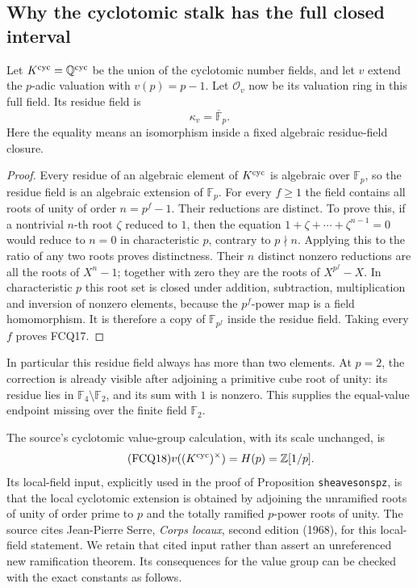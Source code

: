 \subsection{Why the cyclotomic stalk has the full closed interval}

Let $K^{\rm cyc}=\mathbb Q^{\rm cyc}$ be the union of the
cyclotomic number fields, and let $v$ extend the $p$-adic
valuation with $v(p)=p-1$. Let $\mathcal O_v$ now be its
valuation ring in this full field. Its residue field is
\begin{equation}\tag{FCQ17}
\kappa_v=\overline{\mathbb F}_p.
\end{equation}
Here the equality means an isomorphism inside a fixed
algebraic residue-field closure.

\begin{proof}
Every residue of an algebraic element of $K^{\rm cyc}$
is algebraic over $\mathbb F_p$, so the residue field is
an algebraic extension of $\mathbb F_p$. For every $f\ge1$
the field contains all roots of unity of order
$n=p^f-1$. Their reductions are distinct. To prove this,
if a nontrivial $n$-th root $\zeta$ reduced to $1$,
then the equation
$1+\zeta+\cdots+\zeta^{n-1}=0$ would reduce to
$n=0$ in characteristic $p$, contrary to $p\nmid n$.
Applying this to the ratio of any two roots proves
distinctness. Their $n$ distinct nonzero reductions are
all the roots of $X^n-1$; together with zero they are
the roots of $X^{p^f}-X$. In characteristic $p$ this
root set is closed under addition, subtraction,
multiplication and inversion of nonzero elements,
because the $p^f$-power map is a field homomorphism.
It is therefore a copy of $\mathbb F_{p^f}$ inside
the residue field. Taking every $f$ proves FCQ17.
\end{proof}

In particular this residue field always has more than two
elements. At $p=2$, the correction is already visible after
adjoining a primitive cube root of unity: its residue lies
in $\mathbb F_4\setminus\mathbb F_2$, and its sum with $1$
is nonzero. This supplies the equal-value endpoint missing
over the finite field $\mathbb F_2$.

The source's cyclotomic value-group calculation, with its
scale unchanged, is
\begin{equation}\tag{FCQ18}
v((K^{\rm cyc})^\times)=H(p)=\mathbb Z[1/p].
\end{equation}
Its local-field input, explicitly used in the proof of
Proposition \texttt{sheavesonspz}, is that the local
cyclotomic extension is obtained by adjoining the unramified
roots of unity of order prime to $p$ and the totally ramified
$p$-power roots of unity. The source cites Jean-Pierre Serre,
\emph{Corps locaux}, second edition (1968), for this
local-field statement. We retain that cited input rather
than assert an unreferenced new ramification theorem.
Its consequences for the value group can be checked
with the exact constants as follows.

